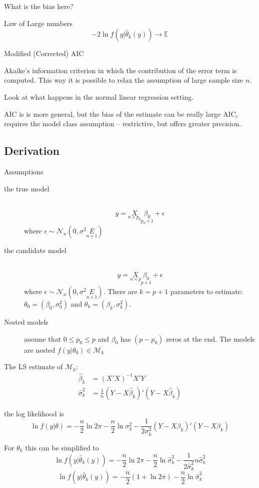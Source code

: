 \documentclass[a4paper]{article}
\newcommand{\brac}[1]{{\left ( #1 \right )}}
\newcommand{\induc}[1]{{\left . #1 \right \vert}}
\newcommand{\Mcal}{\mathcal{M}}
\newcommand{\Ncal}{\mathcal{N}}
\newcommand{\Ex}[0]{{\mathbb{E}}}
\begin{document}
What is the bias here?

Law of Large numbers
\[-2 \ln f\brac{\induc{y}\hat{\theta}_k(y)} \to \Ex \]

Modified (Corrected) AIC

Akaike's information criterion in which the contribution of the error term is computed.
This way it is possible to relax the assumption of large sample size $n$.

Look at what happens in the normal linear regression setting.

AIC is is more general, but the bias of the estimate can be really large
$\text{AIC}_c$ requires the model class assumption -- restrictive, but offers greater precision.

\subsection{Derivation} %
\label{sub:derivation}
Assumptions \begin{description}
	\item[the true model]\hfill\\
	\[y = \underset{n\times p_0}{X}\underset{p_0\times 1}{\beta_0} + \epsilon\]
	where $\epsilon \sim \Ncal_n\brac{0,\sigma^2 \underset{n\times 1}{E}}$
	\item[the candidate model] \hfill\\
	\[y = \underset{n\times p}{X}\underset{p\times 1}{\beta_0} + \epsilon\]
	where $\epsilon \sim \Ncal_n\brac{0,\sigma^2 \underset{n\times 1}{E}}$.
	There are $k=p+1$ parameters to estimate: $\theta_0 = \brac{\beta_0,\sigma_0^2}$ and $\theta_k = \brac{\beta_k,\sigma_k^2}$.
	\item[Nested models] assume that $0\leq p_0 \leq p$ and $\beta_0$ has $(p-p_0)$ zeros at the end. The models are nested $f\brac{\induc{y}\theta_0}\in \Mcal_k$
\end{description}

The LS estimate of $\Mcal_k$:\begin{align*}
	\hat{\beta}_k &= \brac{X'X}^{-1} X'Y\\
	\hat{\sigma}^2_k &= \frac{1}{n}\brac{Y-X\hat{\beta}_k}'\brac{Y-X\hat{\beta}_k}
\end{align*}


the log likelihood is 
\[\ln f\brac{\induc{y}\theta} = -\frac{n}{2} \ln 2\pi -\frac{n}{2}\ln \sigma^2_k - \frac{1}{2\sigma^2_k} \brac{Y-X\beta_k}'\brac{Y-X\beta_k}\]

For $\theta_k$ this can be simplified to 
\[\ln f\brac{\induc{y}\hat{\theta}_k(y)} = -\frac{n}{2} \ln 2\pi -\frac{n}{2}\ln \hat{\sigma}^2_k - \frac{1}{2\hat{\sigma}^2_k} n \hat{\sigma}^2_k \]
\[\ln f\brac{\induc{y}\hat{\theta}_k(y)} = -\frac{n}{2} \brac{ 1 + \ln 2\pi} -\frac{n}{2}\ln \hat{\sigma}^2_k\]
\end{document}
